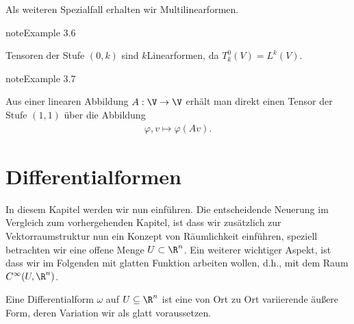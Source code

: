 \documentclass[letterpaper,10pt,english]{jupyterBook}
\begin{document}
\sphinxAtStartPar
Als weiteren Spezialfall erhalten wir Multilinearformen.
\label{vektoranalysis/tensor:example-7}
\begin{sphinxadmonition}{note}{Example 3.6}



\sphinxAtStartPar
Tensoren der Stufe \((0,k)\) sind \(k\)\sphinxhyphen{}Linearformen, da \(T^0_k(V) = L^k(V)\).
\end{sphinxadmonition}
\label{vektoranalysis/tensor:example-8}
\begin{sphinxadmonition}{note}{Example 3.7}



\sphinxAtStartPar
Aus einer linearen Abbildung \(A:\V\to\V\) erhält man direkt einen Tensor der Stufe \((1,1)\) über die Abbildung
\begin{equation*}
\begin{split}\varphi, v \mapsto \varphi(Av).\end{split}
\end{equation*}\end{sphinxadmonition}


\section{Differentialformen}
\label{\detokenize{vektoranalysis/diffformen:differentialformen}}\label{\detokenize{vektoranalysis/diffformen::doc}}
\sphinxAtStartPar
In diesem Kapitel werden wir nun  einführen. Die entscheidende Neuerung im Vergleich zum vorhergehenden Kapitel, ist
dass wir zusätzlich zur Vektorraumstruktur nun ein Konzept von Räumlichkeit einführen, speziell betrachten wir eine offene Menge \(U\subset\R^n\). Ein weiterer wichtiger Aspekt, ist dass wir im Folgenden mit glatten Funktion arbeiten wollen, d.h., mit dem Raum \(C^\infty(U,\R^n)\).

\sphinxAtStartPar
Eine Differentialform \(\omega\) auf \(U\subseteq\R^n\) ist eine von Ort zu Ort variierende äußere Form, deren Variation wir als glatt voraussetzen.
\end{document}
